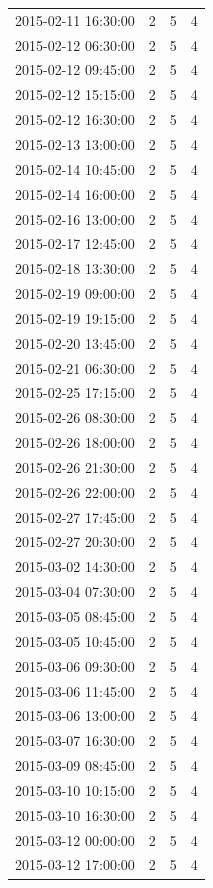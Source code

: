 \begin{tabular}{lrrr}
2015-02-11 16:30:00 & 2 & 5 & 4 \\
2015-02-12 06:30:00 & 2 & 5 & 4 \\
2015-02-12 09:45:00 & 2 & 5 & 4 \\
2015-02-12 15:15:00 & 2 & 5 & 4 \\
2015-02-12 16:30:00 & 2 & 5 & 4 \\
2015-02-13 13:00:00 & 2 & 5 & 4 \\
2015-02-14 10:45:00 & 2 & 5 & 4 \\
2015-02-14 16:00:00 & 2 & 5 & 4 \\
2015-02-16 13:00:00 & 2 & 5 & 4 \\
2015-02-17 12:45:00 & 2 & 5 & 4 \\
2015-02-18 13:30:00 & 2 & 5 & 4 \\
2015-02-19 09:00:00 & 2 & 5 & 4 \\
2015-02-19 19:15:00 & 2 & 5 & 4 \\
2015-02-20 13:45:00 & 2 & 5 & 4 \\
2015-02-21 06:30:00 & 2 & 5 & 4 \\
2015-02-25 17:15:00 & 2 & 5 & 4 \\
2015-02-26 08:30:00 & 2 & 5 & 4 \\
2015-02-26 18:00:00 & 2 & 5 & 4 \\
2015-02-26 21:30:00 & 2 & 5 & 4 \\
2015-02-26 22:00:00 & 2 & 5 & 4 \\
2015-02-27 17:45:00 & 2 & 5 & 4 \\
2015-02-27 20:30:00 & 2 & 5 & 4 \\
2015-03-02 14:30:00 & 2 & 5 & 4 \\
2015-03-04 07:30:00 & 2 & 5 & 4 \\
2015-03-05 08:45:00 & 2 & 5 & 4 \\
2015-03-05 10:45:00 & 2 & 5 & 4 \\
2015-03-06 09:30:00 & 2 & 5 & 4 \\
2015-03-06 11:45:00 & 2 & 5 & 4 \\
2015-03-06 13:00:00 & 2 & 5 & 4 \\
2015-03-07 16:30:00 & 2 & 5 & 4 \\
2015-03-09 08:45:00 & 2 & 5 & 4 \\
2015-03-10 10:15:00 & 2 & 5 & 4 \\
2015-03-10 16:30:00 & 2 & 5 & 4 \\
2015-03-12 00:00:00 & 2 & 5 & 4 \\
2015-03-12 17:00:00 & 2 & 5 & 4 \\

\end{tabular}
